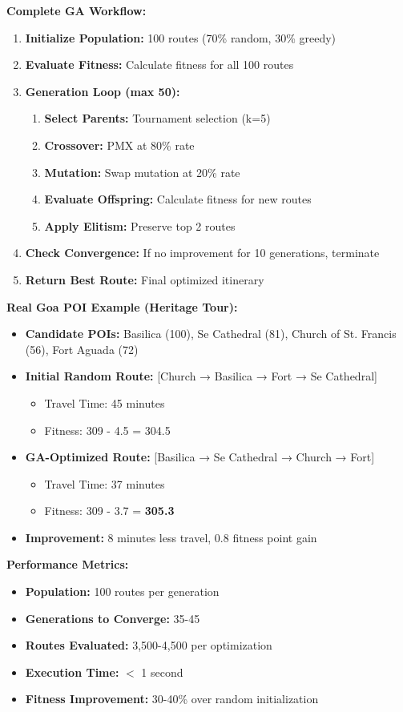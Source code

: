 \textbf{Complete GA Workflow:}
\begin{enumerate}
\item \textbf{Initialize Population:} 100 routes (70\% random, 30\% greedy)
\item \textbf{Evaluate Fitness:} Calculate fitness for all 100 routes
\item \textbf{Generation Loop (max 50):}
\begin{enumerate}
    \item \textbf{Select Parents:} Tournament selection (k=5)
    \item \textbf{Crossover:} PMX at 80\% rate
    \item \textbf{Mutation:} Swap mutation at 20\% rate
    \item \textbf{Evaluate Offspring:} Calculate fitness for new routes
    \item \textbf{Apply Elitism:} Preserve top 2 routes
\end{enumerate}
\item \textbf{Check Convergence:} If no improvement for 10 generations, terminate
\item \textbf{Return Best Route:} Final optimized itinerary
\end{enumerate}

\textbf{Real Goa POI Example (Heritage Tour):}
\begin{itemize}
\item \textbf{Candidate POIs:} Basilica (100), Se Cathedral (81), Church of St. Francis (56), Fort Aguada (72)
\item \textbf{Initial Random Route:} [Church → Basilica → Fort → Se Cathedral]
\begin{itemize}
    \item Travel Time: 45 minutes
    \item Fitness: 309 - 4.5 = 304.5
\end{itemize}
\item \textbf{GA-Optimized Route:} [Basilica → Se Cathedral → Church → Fort]
\begin{itemize}
    \item Travel Time: 37 minutes
    \item Fitness: 309 - 3.7 = \textbf{305.3}
\end{itemize}
\item \textbf{Improvement:} 8 minutes less travel, 0.8 fitness point gain
\end{itemize}

\textbf{Performance Metrics:}
\begin{itemize}
\item \textbf{Population:} 100 routes per generation
\item \textbf{Generations to Converge:} 35-45
\item \textbf{Routes Evaluated:} 3,500-4,500 per optimization
\item \textbf{Execution Time:} $<$ 1 second
\item \textbf{Fitness Improvement:} 30-40\% over random initialization
\end{itemize}

